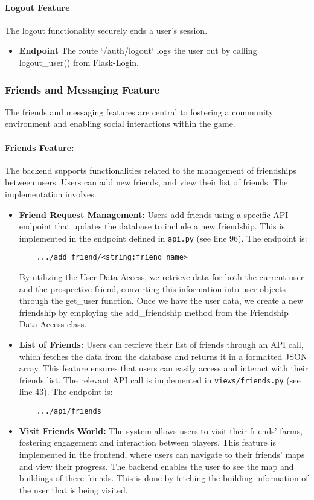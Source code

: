 \documentclass[12pt]{article}
\begin{document}
\paragraph{Logout Feature}
The logout functionality securely ends a user's session.
\begin{itemize}
    \item \textbf{Endpoint} The route `/auth/logout` logs the user out by calling logout\_user() from Flask-Login.
\end{itemize}
\subsubsection{Friends and Messaging Feature}
The friends and messaging features are central to fostering a community environment and enabling social interactions within the game.
\paragraph{Friends Feature:}
The backend supports functionalities related to the management of friendships between users. Users can add new friends, and view their list of friends. The implementation involves:
\begin{itemize}
    \item \textbf{Friend Request Management:} Users add friends using a specific API endpoint that updates the database to include a new friendship. This is implemented in the endpoint defined in \texttt{api.py} (see line 96). The endpoint is:
    \begin{verbatim}
    .../add_friend/<string:friend_name>
    \end{verbatim}
    By utilizing the User Data Access, we retrieve data for both the current user and the prospective friend, converting this information into user objects through the get\_user function. Once we have the user data, we create a new friendship by employing the add\_friendship method from the Friendship Data Access class.
    \item \textbf{List of Friends:} Users can retrieve their list of friends through an API call, which fetches the data from the database and returns it in a formatted JSON array. This feature ensures that users can easily access and interact with their friends list. The relevant API call is implemented in \texttt{views/friends.py} (see line 43). The endpoint is:
    \begin{verbatim}
    .../api/friends
    \end{verbatim}
    \item \textbf{Visit Friends World:} The system allows users to visit their friends' farms, fostering engagement and interaction between players. This feature is implemented in the frontend, where users can navigate to their friends' maps and view their progress.
    The backend enables the user to see the map and buildings of there friends. This is done by fetching the building information of the user that is being visited.
\end{itemize}
\end{document}
